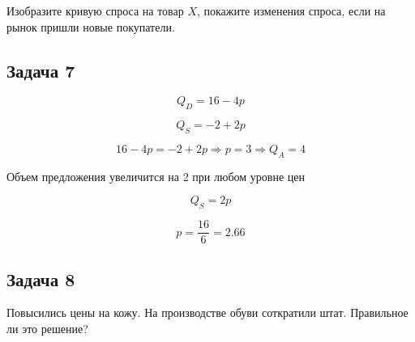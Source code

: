 Изобразите кривую спроса на товар $X$, покажите изменения спроса, если на рынок пришли новые покупатели.

\subsection{Задача 7}

\begin{equation*}
    Q_D = 16 - 4p
\end{equation*}

\begin{equation*}
    Q_S = -2 + 2p
\end{equation*}

\begin{equation*}
    16 - 4p = -2 + 2p \Rightarrow p = 3 \Rightarrow Q_A = 4
\end{equation*}

Объем предложения увеличится на 2 при любом уровне цен

\begin{equation*}
    Q_S = 2p
\end{equation*}

\begin{equation*}
    p = \frac{16}{6} = 2.66
\end{equation*}

\subsection{Задача 8}

Повысились цены на кожу. На производстве обуви соткратили штат. Правильное ли это решение?
